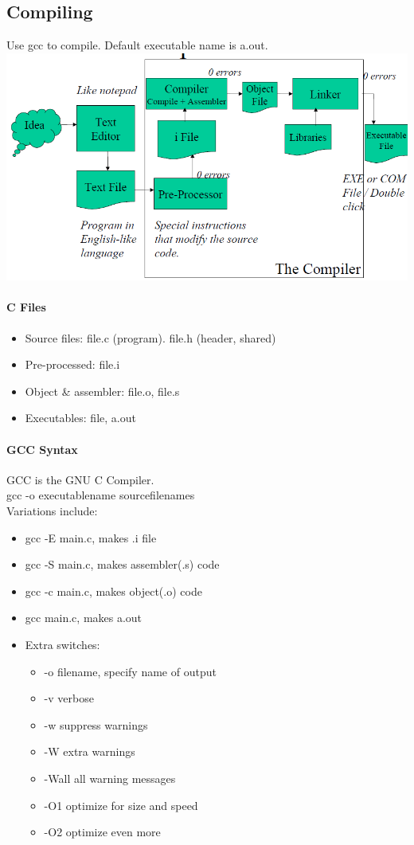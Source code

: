 \documentclass[12 pt]{article}
\begin{document}
\subsection{Compiling} Use gcc to compile. Default executable name is a.out.
\\ \includegraphics[scale=0.5]{cco}
\paragraph{C Files}
\begin{itemize}
	\item Source files: file.c (program). file.h (header, shared)
	\item Pre-processed: file.i
	\item Object \& assembler: file.o, file.s
	\item Executables: file, a.out
	\end{itemize}
\paragraph{GCC Syntax}
GCC is the GNU C Compiler.
\\ gcc -o executablename sourcefilenames
\\ Variations include:
\begin{itemize}
	\item gcc -E main.c, makes .i file
	\item gcc -S main.c, makes assembler(.s) code
	\item gcc -c main.c, makes object(.o) code
	\item gcc main.c, makes a.out
	\item Extra switches:
	\begin{itemize}
		\item -o filename, specify name of output
		\item -v verbose
		\item -w suppress warnings
		\item -W extra warnings
		\item -Wall all warning messages
		\item -O1 optimize for size and speed
		\item -O2 optimize even more
	\end{itemize}
\end{itemize}
\end{document}
